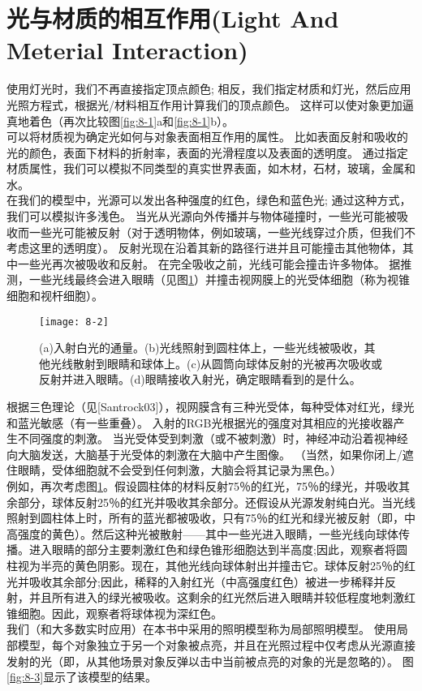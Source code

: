 \section{光与材质的相互作用(Light And Meterial Interaction)}
\begin{flushleft}
使用灯光时，我们不再直接指定顶点颜色; 相反，我们指定材质和灯光，然后应用光照方程式，根据光/材料相互作用计算我们的顶点颜色。 这样可以使对象更加逼真地着色（再次比较图\ref{fig:8-1}a和\ref{fig:8-1}b）。\\
可以将材质视为确定光如何与对象表面相互作用的属性。 比如表面反射和吸收的光的颜色，表面下材料的折射率，表面的光滑程度以及表面的透明度。 通过指定材质属性，我们可以模拟不同类型的真实世界表面，如木材，石材，玻璃，金属和水。\\
在我们的模型中，光源可以发出各种强度的红色，绿色和蓝色光; 通过这种方式，我们可以模拟许多浅色。 当光从光源向外传播并与物体碰撞时，一些光可能被吸收而一些光可能被反射（对于透明物体，例如玻璃，一些光线穿过介质，但我们不考虑这里的透明度）。 反射光现在沿着其新的路径行进并且可能撞击其他物体，其中一些光再次被吸收和反射。 在完全吸收之前，光线可能会撞击许多物体。 据推测，一些光线最终会进入眼睛（见图\ref{fig:8-2}）并撞击视网膜上的光受体细胞（称为视锥细胞和视杆细胞）。\\
\end{flushleft}

\begin{figure}[h]
    \texttt{[image: 8-2]}
    \centering
    \caption{(a)入射白光的通量。(b)光线照射到圆柱体上，一些光线被吸收，其他光线散射到眼睛和球体上。(c)从圆筒向球体反射的光被再次吸收或反射并进入眼睛。(d)眼睛接收入射光，确定眼睛看到的是什么。}
    \label{fig:8-2}
\end{figure}

\begin{flushleft}
根据三色理论（见[Santrock03]），视网膜含有三种光受体，每种受体对红光，绿光和蓝光敏感（有一些重叠）。 入射的RGB光根据光的强度对其相应的光接收器产生不同强度的刺激。 当光受体受到刺激（或不被刺激）时，神经冲动沿着视神经向大脑发送，大脑基于光受体的刺激在大脑中产生图像。 （当然，如果你闭上/遮住眼睛，受体细胞就不会受到任何刺激，大脑会将其记录为黑色。）\\

例如，再次考虑图\ref{fig:8-2}。假设圆柱体的材料反射75％的红光，75％的绿光，并吸收其余部分，球体反射25％的红光并吸收其余部分。还假设从光源发射纯白光。当光线照射到圆柱体上时，所有的蓝光都被吸收，只有75％的红光和绿光被反射（即，中高强度的黄色）。然后这种光被散射——其中一些光进入眼睛，一些光线向球体传播。进入眼睛的部分主要刺激红色和绿色锥形细胞达到半高度;因此，观察者将圆柱视为半亮的黄色阴影。现在，其他光线向球体射出并撞击它。球体反射25％的红光并吸收其余部分;因此，稀释的入射红光（中高强度红色）被进一步稀释并反射，并且所有进入的绿光被吸收。这剩余的红光然后进入眼睛并较低程度地刺激红锥细胞。因此，观察者将球体视为深红色。\\
我们（和大多数实时应用）在本书中采用的照明模型称为局部照明模型。 使用局部模型，每个对象独立于另一个对象被点亮，并且在光照过程中仅考虑从光源直接发射的光（即，从其他场景对象反弹以击中当前被点亮的对象的光是忽略的）。 图\ref{fig:8-3}显示了该模型的结果。
\end{flushleft}


